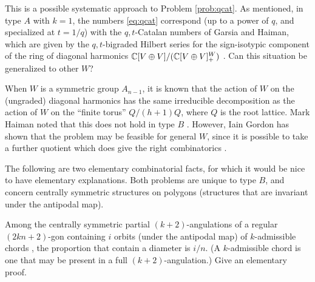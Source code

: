 \documentclass[12pt,letterpaper, reqno]{amsart}
\begin{document}
\begin{problemblock}

\begin{problem}
 This is a possible systematic approach to Problem \ref{prob:qcat}. As mentioned, in type $A$ with $k=1$, the numbers \eqref{eq:qcat} correspond (up to a power of $q$, and specialized at $t=1/q$) with the $q,t$-Catalan numbers of Garsia and Haiman, which are given by the $q,t$-bigraded Hilbert series for the sign-isotypic component of the ring of diagonal harmonics $\mathbb C[V\oplus V]/(\mathbb C[V\oplus V]_+^W)$ \cite{haiman}. Can this situation be generalized to other $W$?
\end{problem}

When $W$ is a symmetric group $A_{n-1}$, it is known that the action of $W$ on the (ungraded) diagonal harmonics has the same irreducible decomposition as the action of $W$ on the ``finite torus'' $Q/(h+1)Q$, where $Q$ is the root lattice. Mark Haiman noted that this does not hold in type $B$ \cite{haiman}. However, Iain Gordon has shown that the problem may be feasible for general $W$, since it is possible to take a further quotient which does give the right combinatorics \cite{gordon}.

\end{problemblock}

\begin{problemblock}
 The following are two elementary combinatorial facts, for which it would be nice to have elementary explanations. Both problems are unique to type $B$, and concern centrally symmetric structures on polygons (structures that are invariant under the antipodal map).

\begin{problem}
 Among the centrally symmetric partial $(k+2)$-angulations of a regular $(2kn+2)$-gon containing $i$ orbits (under the antipodal map) of $k$-admissible chords \cite{fomin-reading,tzanaki}, the proportion that contain a diameter is $i/n$. (A $k$-admissible chord is one that may be present in a full $(k+2)$-angulation.) Give an elementary proof.
\end{problem}
\end{problemblock}
\end{document}
